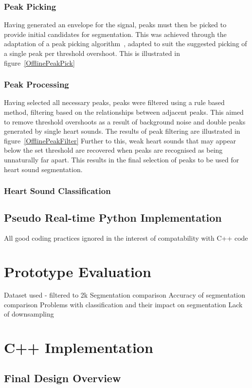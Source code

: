 \documentclass[titlepage]{scrartcl}
\begin{document}
\subsubsection{Peak Picking}
Having generated an envelope for the signal, peaks must then be picked to
provide initial candidates for segmentation. This was achieved through the
adaptation of a peak picking algorithm~\parencite{PeakUtils}, adapted to suit the
suggested picking of a single peak per threshold overshoot. This is illustrated
in figure~\ref{OfflinePeakPick}

\subsubsection{Peak Processing}
Having selected all necessary peaks, peaks were filtered using a rule based
method, filtering based on the relationships between adjacent peaks. This aimed
to remove threshold overshoots as a result of background noise and double peaks
generated by single heart sounds.
The results of peak filtering are illustrated in figure~\ref{OfflinePeakFilter}
Further to this, weak heart sounds that may appear below the set threshold are
recovered when peaks are recognised as being unnaturally far apart. This
results in the final selection of peaks to be used for heart sound
segmentation.

\subsubsection{Heart Sound Classification}

\subsection{Pseudo Real-time Python Implementation}
All good coding practices ignored in the interest of compatability with C++
code
\section{Prototype Evaluation}
Dataset used
- filtered to 2k
Segmentation comparison
Accuracy of segmentation comparison
Problems with classification and their impact on segmentation
Lack of downsampling
\section{C++ Implementation}
\subsection{Final Design Overview}
\end{document}

